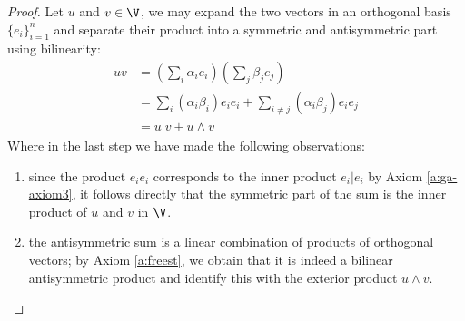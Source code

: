 \begin{proof}
	Let $u$ and $v \in \V$, we may expand the two vectors in an orthogonal basis $\{e_i\}_{i=1}^n$ and separate their product into a symmetric and antisymmetric part using bilinearity:
	\begin{align*}
		uv &= \left(\sum_i \alpha_ie_i \right)\left(\sum_j \beta_je_j \right) \\
		   &= \sum_{i} (\alpha_i\beta_i)e_ie_i + \sum_{i \neq j} (\alpha_i\beta_j)e_ie_j \\
		   &= u|v + u\wedge v
	\end{align*}
	Where in the last step we have made the following observations:
	\begin{enumerate}
		\item since the product $e_ie_i$ corresponds to the inner product $e_i|e_i$ by Axiom \ref{a:ga-axiom3}, it follows directly that the symmetric part of the sum is the inner product of $u$ and $v$ in $\V$.

		\item the antisymmetric sum is a linear combination of products of orthogonal vectors; by Axiom \ref{a:freest}, we obtain that it is indeed a bilinear antisymmetric product and identify this with the exterior product $u\wedge v$.
	\end{enumerate}
\end{proof}
